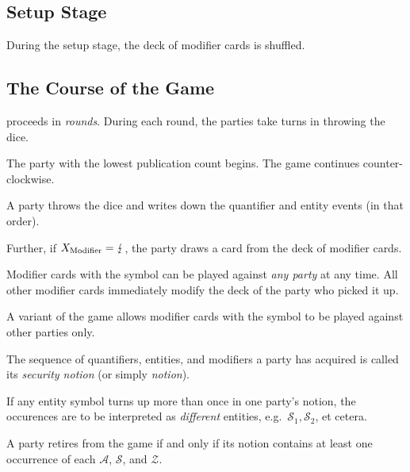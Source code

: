 \documentclass{llncs}
\begin{document}
\subsection{Setup Stage}
During the setup stage, the deck of modifier cards is shuffled.

\subsection{The Course of the Game}
\ucftw proceeds in \emph{rounds}.
During each round, the parties take turns in throwing the dice.

\begin{theorem}
	The party with the lowest publication count begins. The game continues counter-clockwise.
\end{theorem}

A party throws the dice and writes down the quantifier and entity events (in that order).


Further, if $X_\text{Modifier} = \lightning$, the party draws a card from the deck of modifier cards. 

\begin{theorem}
	Modifier cards with the \stopsign symbol can be played against \emph{any party} at any time.
	All other modifier cards immediately modify the deck of the party who picked it up. 
\end{theorem}

\begin{remark}
	A variant of the game allows modifier cards with the \stopsign symbol to be played against other parties only.
\end{remark}

\begin{definition}
	The sequence of quantifiers, entities, and modifiers a party has acquired is called its \emph{security notion} (or simply \emph{notion}).
\end{definition}

\begin{theorem}
	If any entity symbol turns up more than once in one party's notion, the occurences are to be interpreted as \emph{different} entities, e.g.\ $\mathcal{S}_1, \mathcal{S}_2$, et cetera.
\end{theorem}

\begin{theorem}
	A party retires from the game if and only if its notion contains at least one occurrence of each $\mathcal{A}$, $\mathcal{S}$, and $\mathcal{Z}$.
\end{theorem}
\end{document}
